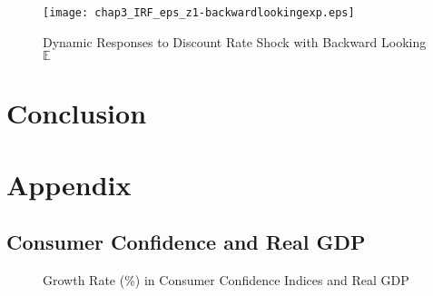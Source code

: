 \documentclass[12pt]{article}
\newcommand{\1}{\mathbbm 1}
\begin{document}
\begin{figure}[H]
	\begin{center}
		\texttt{[image: chap3\_IRF\_eps\_z1-backwardlookingexp.eps]}
	\end{center}
	\caption{Dynamic Responses to Discount Rate Shock with Backward Looking $\mathbb{E}$}
\end{figure}
		
		\newpage
		
		\section{Conclusion}
		
		
		
		
		\newpage
		
		
		
		
		
		\section{Appendix}
		
		\subsection{Consumer Confidence and Real GDP}
		
		\begin{figure}[H]
			\centering
			\scalebox{0.8}{}
			\caption[]{Growth Rate (\%) in Consumer Confidence Indices and Real GDP}
		\end{figure}
		
	
	
	\newpage
	\singlespacing
	\newpage
	
	
	\clearpage
	
	
	
	
	
	
	
	
	
\end{document}
